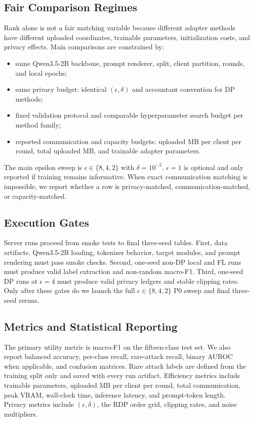 \subsection{Fair Comparison Regimes}
Rank alone is not a fair matching variable because different adapter methods have different uploaded coordinates, trainable parameters, initialization costs, and privacy effects. Main comparisons are constrained by:
\begin{itemize}[leftmargin=*]
  \item same Qwen3.5-2B backbone, prompt renderer, split, client partition, rounds, and local epochs;
  \item same privacy budget: identical $(\epsilon,\delta)$ and accountant convention for DP methods;
  \item fixed validation protocol and comparable hyperparameter search budget per method family;
  \item reported communication and capacity budgets: uploaded MB per client per round, total uploaded MB, and trainable adapter parameters.
\end{itemize}
The main epsilon sweep is $\epsilon\in\{8,4,2\}$ with $\delta=10^{-5}$. $\epsilon=1$ is optional and only reported if training remains informative. When exact communication matching is impossible, we report whether a row is privacy-matched, communication-matched, or capacity-matched.

\subsection{Execution Gates}
Server runs proceed from smoke tests to final three-seed tables. First, data artifacts, Qwen3.5-2B loading, tokenizer behavior, target modules, and prompt rendering must pass smoke checks. Second, one-seed non-DP local and FL runs must produce valid label extraction and non-random macro-F1. Third, one-seed DP runs at $\epsilon=4$ must produce valid privacy ledgers and stable clipping rates. Only after these gates do we launch the full $\epsilon\in\{8,4,2\}$ P0 sweep and final three-seed reruns.

\subsection{Metrics and Statistical Reporting}
The primary utility metric is macro-F1 on the fifteen-class test set. We also report balanced accuracy, per-class recall, rare-attack recall, binary AUROC when applicable, and confusion matrices. Rare attack labels are defined from the training split only and saved with every run artifact. Efficiency metrics include trainable parameters, uploaded MB per client per round, total communication, peak VRAM, wall-clock time, inference latency, and prompt-token length. Privacy metrics include $(\epsilon,\delta)$, the RDP order grid, clipping rates, and noise multipliers.

